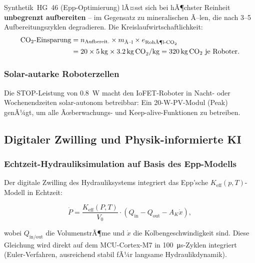 ﻿\documentclass[a4paper,12pt]{scrreprt}
\theoremstyle{definition}
\begin{document}
Synthetik~HG~46 (Epp-Optimierung) lÃ¤sst sich bei hÃ¶chster Reinheit
\textbf{unbegrenzt aufbereiten} -- im Gegensatz zu mineralischen Ã–len,
die nach 3--5 Aufbereitungszyklen degradieren.
Die Kreislaufwirtschaftlichkeit:
\begin{align}
  \text{CO}_2\text{-Einsparung} &= n_{\text{Aufbereit.}} \times m_{\text{Ã–l}}
    \times e_{\text{RohÃ¶l-CO}_2} \notag \\
  &= 20 \times \SI{5}{\kilo\gram} \times \SI{3.2}{\kilo\gram\,\text{CO}_2\per\kilo\gram}
  = \SI{320}{\kilo\gram}\,\text{CO}_2 \text{ je Roboter.}
\end{align}

\subsubsection{Solar-autarke Roboterzellen}

Die STOP-Leistung von \SI{0.8}{\watt} macht den IoFET-Roboter
in Nacht- oder Wochenendzeiten solar-autonom betreibbar:
Ein 20-\si{\watt}-PV-Modul (Peak) genÃ¼gt, um alle Ãœberwachungs-
und Keep-alive-Funktionen zu betreiben.

\subsection{Digitaler Zwilling und Physik-informierte KI}

\subsubsection{Echtzeit-Hydrauliksimulation auf Basis des Epp-Modells}

Der digitale Zwilling des Hydrauliksystems integriert das
Epp'sche $K_{\text{eff}}(p,T)$-Modell in Echtzeit:

\begin{equation}
  \dot{P} = \frac{K_{\text{eff}}(P, T)}{V_0} \cdot
            \left(Q_{\text{in}} - Q_{\text{out}} - A_K \dot{x}\right),
  \label{eq:druckdynamik}
\end{equation}

wobei $Q_{\text{in/out}}$ die VolumenstrÃ¶me und $\dot{x}$ die
Kolbengeschwindigkeit sind. Diese Gleichung wird direkt auf dem
MCU-Cortex-M7 in \SI{100}{\micro\second}-Zyklen integriert
(Euler-Verfahren, ausreichend stabil fÃ¼r langsame Hydraulikdynamik).
\end{document}
